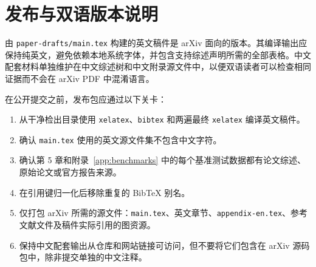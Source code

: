 \section{发布与双语版本说明}
\label{app:release-notes}

由 \texttt{paper-drafts/main.tex} 构建的英文稿件是 arXiv 面向的版本。其编译输出应保持纯英文，避免依赖本地系统字体，并包含支持综述声明所需的全部表格。中文配套材料单独维护在中文综述树和中文附录源文件中，以便双语读者可以检查相同证据而不会在 arXiv PDF 中混淆语言。

在公开提交之前，发布包应通过以下关卡：

\begin{enumerate}
\item 从干净检出目录使用 \texttt{xelatex}、\texttt{bibtex} 和两遍最终 \texttt{xelatex} 编译英文稿件。
\item 确认 \texttt{main.tex} 使用的英文源文件集不包含中文字符。
\item 确认第 5 章和附录~\ref{app:benchmarks} 中的每个基准测试数据都有论文综述、原始论文或官方报告来源。
\item 在引用键归一化后移除重复的 BibTeX 别名。
\item 仅打包 arXiv 所需的源文件：\texttt{main.tex}、英文章节、\texttt{appendix-en.tex}、参考文献文件及稿件实际引用的图资源。
\item 保持中文配套输出从仓库和网站链接可访问，但不要将它们包含在 arXiv 源码包中，除非提交单独的中文注释。
\end{enumerate}
